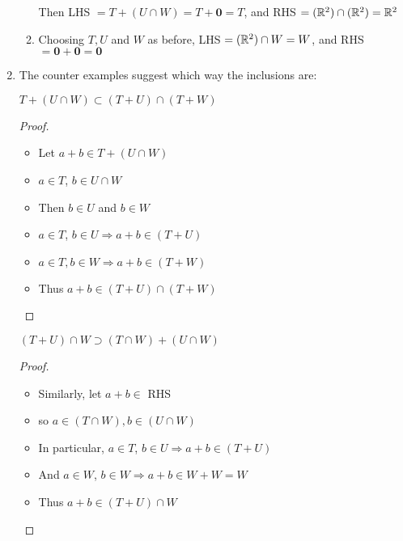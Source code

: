 \documentclass[a4paper]{article}
\begin{document}
\begin{enumerate}
\begin{enumerate}[label = (\alph*)]
		
		Then LHS $ =  T + (U \cap W) = T + \mathbf{0} = T$, and RHS $ = (\mathbb{R}^{2}) \cap (\mathbb{R}^{2})  = \mathbb{R}^{2} $ 
		
		\item Choosing $ T, U $ and $ W $ as before,
		LHS $ = (\mathbb{R}^{2}) \cap W = W $, and RHS $ = \mathbf{0} + \mathbf{0} = \mathbf{0} $
		
	\end{enumerate}

	\item The counter examples suggest which way the inclusions are:
	
	\begin{prop} 
		$ T + (U \cap W) \subset (T + U) \cap ( T + W ) $
	\end{prop} 

\begin{proof}
	\begin{itemize}
		\item Let $ a + b \in T + (U \cap W) $
		\item $ a \in T $, $ b \in U \cap W $
		\item Then $ b \in U $ and $ b \in W $
		\item $ a \in T $, $ b \in U  \Rightarrow a + b \in (T + U) $
		\item $ a \in T, b \in W \Rightarrow a + b \in (T + W) $
		\item Thus $ a + b \in (T + U) \cap (T + W) $
		\end{itemize}
\end{proof}

\begin{prop} 
	$ (T + U) \cap W \supset (T \cap W) + (U \cap W) $
\end{prop}

\begin{proof}
	\begin{itemize}
		\item Similarly, let $ a + b \in $ RHS
		\item so $ a \in (T \cap W), b \in (U \cap W) $
		\item In particular, $ a \in T $, $ b \in U  \Rightarrow a + b \in (T + U)$
		\item And $ a \in W $, $ b \in W \Rightarrow a + b \in W + W = W $
		\item Thus $ a + b \in (T + U) \cap W $
	\end{itemize}
\end{proof}
		
	\end{enumerate}
	
\end{document}
